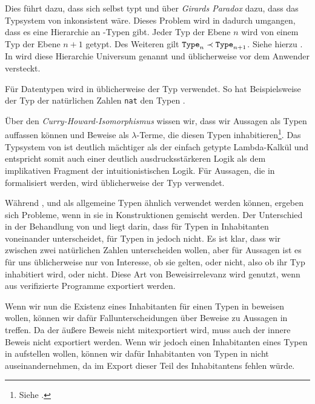 Dies führt dazu, dass \Type{} sich selbst typt und über \emph{Girards Paradox} dazu, dass das Typsystem von \coq{} inkonsistent wäre\cite{Coquand86ananalysis}. Dieses Problem wird in \coq{} dadurch umgangen, dass es eine Hierarchie an \Type-Typen gibt. Jeder Typ \Type{} der Ebene $n$ wird von einem Typ \Type{} der Ebene $n + 1$ getypt. Des Weiteren gilt $\texttt{Type}_n \prec \texttt{Type}_{n+1}$. Siehe hierzu . In \coq{} wird diese Hierarchie Universum genannt und üblicherweise vor dem Anwender versteckt. 

Für Datentypen wird in \coq{} üblicherweise der Typ \Set{} verwendet. So hat Beispielsweise der Typ der natürlichen Zahlen \texttt{nat} den Typen \Set.
\begin{icode}
\end{icode} 
    
Über den \emph{Curry-Howard-Isomorphismus} wissen wir, dass wir Aussagen als Typen auffassen können und Beweise als $\lambda$-Terme, die diesen Typen inhabitieren\footnote{Siehe .}. Das Typsystem von \coq{} ist deutlich mächtiger als der einfach getypte Lambda-Kalkül und entspricht somit auch einer deutlich ausdrucksstärkeren Logik als dem implikativen Fragment der intuitionistischen Logik. Für Aussagen, die in \coq{} formalisiert werden, wird üblicherweise der Typ \Prop{} verwendet.
\begin{icode}
\end{icode}

Während \Type, \Prop{} und \Set{} als allgemeine Typen ähnlich verwendet werden können, ergeben sich Probleme, wenn in sie in Konstruktionen gemischt werden.
Der Unterschied in der Behandlung von \Set{} und \Prop{} liegt darin, dass \coq{} für Typen in \Set{} Inhabitanten voneinander unterscheidet, für Typen in \Prop{} jedoch nicht. Es ist klar, dass wir zwischen zwei natürlichen Zahlen unterscheiden wollen, aber für Aussagen ist es für uns üblicherweise nur von Interesse, ob sie gelten, oder nicht, also ob ihr Typ inhabitiert wird, oder nicht. Diese Art von Beweisirrelevanz wird genutzt, wenn aus \coq{} verifizierte Programme exportiert werden.
 
Wenn wir nun die Existenz eines Inhabitanten für einen Typen in \Prop{} beweisen wollen, können wir dafür Fallunterscheidungen über Beweise zu Aussagen in \Prop{} treffen. Da der äußere Beweis nicht mitexportiert wird, muss auch der innere Beweis nicht exportiert werden. Wenn wir jedoch einen Inhabitanten eines Typen in \Set{} aufstellen wollen, können wir dafür Inhabitanten von Typen in \Prop{} nicht auseinandernehmen, da im Export dieser Teil des Inhabitantens fehlen würde.

